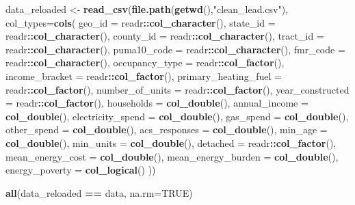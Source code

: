 \documentclass[]{article}
\newenvironment{Shaded}{\begin{snugshade}}{\end{snugshade}}
\newcommand{\DataTypeTok}[1]{\textcolor[rgb]{0.13,0.29,0.53}{#1}}
\newcommand{\KeywordTok}[1]{\textcolor[rgb]{0.13,0.29,0.53}{\textbf{#1}}}
\newcommand{\NormalTok}[1]{#1}
\newcommand{\OperatorTok}[1]{\textcolor[rgb]{0.81,0.36,0.00}{\textbf{#1}}}
\newcommand{\OtherTok}[1]{\textcolor[rgb]{0.56,0.35,0.01}{#1}}
\newcommand{\StringTok}[1]{\textcolor[rgb]{0.31,0.60,0.02}{#1}}
\begin{document}
\begin{Shaded}
\begin{Highlighting}[]
\NormalTok{data_reloaded <-}\StringTok{ }\KeywordTok{read_csv}\NormalTok{(}\KeywordTok{file.path}\NormalTok{(}\KeywordTok{getwd}\NormalTok{(),}\StringTok{"clean_lead.csv"}\NormalTok{),}
                          \DataTypeTok{col_types=}\KeywordTok{cols}\NormalTok{(}
                            \DataTypeTok{geo_id =}\NormalTok{ readr}\OperatorTok{::}\KeywordTok{col_character}\NormalTok{(),}
                            \DataTypeTok{state_id =}\NormalTok{ readr}\OperatorTok{::}\KeywordTok{col_character}\NormalTok{(),}
                            \DataTypeTok{county_id =}\NormalTok{ readr}\OperatorTok{::}\KeywordTok{col_character}\NormalTok{(),}
                            \DataTypeTok{tract_id =}\NormalTok{ readr}\OperatorTok{::}\KeywordTok{col_character}\NormalTok{(),}
                            \DataTypeTok{puma10_code =}\NormalTok{ readr}\OperatorTok{::}\KeywordTok{col_character}\NormalTok{(),}
                            \DataTypeTok{fmr_code =}\NormalTok{ readr}\OperatorTok{::}\KeywordTok{col_character}\NormalTok{(),}
                            \DataTypeTok{occupancy_type =}\NormalTok{ readr}\OperatorTok{::}\KeywordTok{col_factor}\NormalTok{(),}
                            \DataTypeTok{income_bracket =}\NormalTok{ readr}\OperatorTok{::}\KeywordTok{col_factor}\NormalTok{(),}
                            \DataTypeTok{primary_heating_fuel =}\NormalTok{ readr}\OperatorTok{::}\KeywordTok{col_factor}\NormalTok{(),}
                            \DataTypeTok{number_of_units =}\NormalTok{ readr}\OperatorTok{::}\KeywordTok{col_factor}\NormalTok{(),}
                            \DataTypeTok{year_constructed =}\NormalTok{ readr}\OperatorTok{::}\KeywordTok{col_factor}\NormalTok{(),}
                            \DataTypeTok{households =} \KeywordTok{col_double}\NormalTok{(),}
                            \DataTypeTok{annual_income =} \KeywordTok{col_double}\NormalTok{(),}
                            \DataTypeTok{electricity_spend =} \KeywordTok{col_double}\NormalTok{(),}
                            \DataTypeTok{gas_spend =} \KeywordTok{col_double}\NormalTok{(),}
                            \DataTypeTok{other_spend =} \KeywordTok{col_double}\NormalTok{(),}
                            \DataTypeTok{acs_responses =} \KeywordTok{col_double}\NormalTok{(),}
                            \DataTypeTok{min_age =} \KeywordTok{col_double}\NormalTok{(),}
                            \DataTypeTok{min_units =} \KeywordTok{col_double}\NormalTok{(),}
                            \DataTypeTok{detached =}\NormalTok{ readr}\OperatorTok{::}\KeywordTok{col_factor}\NormalTok{(),}
                            \DataTypeTok{mean_energy_cost =} \KeywordTok{col_double}\NormalTok{(),}
                            \DataTypeTok{mean_energy_burden =} \KeywordTok{col_double}\NormalTok{(),}
                            \DataTypeTok{energy_poverty =} \KeywordTok{col_logical}\NormalTok{()}
\NormalTok{                            ))}

\KeywordTok{all}\NormalTok{(data_reloaded }\OperatorTok{==}\StringTok{ }\NormalTok{data, }\DataTypeTok{na.rm=}\OtherTok{TRUE}\NormalTok{)}
\end{Highlighting}
\end{Shaded}
\end{document}
